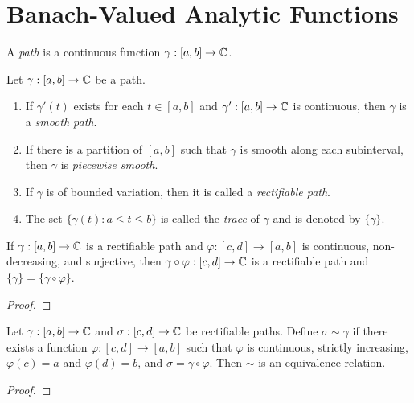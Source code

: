 \documentclass[reqno]{amsart}
\begin{document}
\section{Banach-Valued Analytic Functions}

\begin{definition}
	A \emph{path} is a continuous function $\gamma:[a,b] \rightarrow \mathbb{C}$.
\end{definition}

\begin{definition}
	Let $\gamma:[a,b] \rightarrow \mathbb{C}$ be a path.
	\mbox{}
	\begin{enumerate}[label = (\arabic*),itemsep=1pt,topsep=3pt]
		\item If $\gamma'(t)$ exists for each $t \in [a,b]$ and $\gamma':[a,b] \rightarrow \mathbb{C}$ is continuous, then $\gamma$ is a \emph{smooth path}.
		\item If there is a partition of $[a,b]$ such that $\gamma$ is smooth along each subinterval, then $\gamma$ is \emph{piecewise smooth}.
		\item If $\gamma$ is of bounded variation, then it is called a \emph{rectifiable path}.
		\item The set $\{\gamma(t):a \leq t \leq b\}$ is called the \emph{trace} of $\gamma$ and is denoted by $\{\gamma\}$.
	\end{enumerate}
\end{definition}

\begin{lemma}
	If $\gamma:[a,b] \rightarrow \mathbb{C}$ is a rectifiable path and $\varphi:[c,d] \rightarrow [a,b]$ is continuous, non-decreasing, and surjective, then $\gamma \circ \varphi : [c,d] \rightarrow \mathbb{C}$ is a rectifiable path and $\{\gamma\} = \{\gamma \circ \varphi\}$.
\end{lemma}
{\color{red}
\begin{proof}
		
\end{proof}}

\begin{proposition}
	Let $\gamma:[a,b] \rightarrow \mathbb{C}$ and $\sigma:[c,d] \rightarrow \mathbb{C}$ be rectifiable paths. Define $\sigma \sim \gamma$ if there exists a function $\varphi:[c,d] \rightarrow [a,b]$ such that $\varphi$ is continuous, strictly increasing, $\varphi(c) = a$ and $\varphi(d) = b$, and $\sigma = \gamma \circ \varphi$. Then $\sim$ is an equivalence relation.
\end{proposition}
{\color{red}
\begin{proof}
		
\end{proof}}
\end{document}
